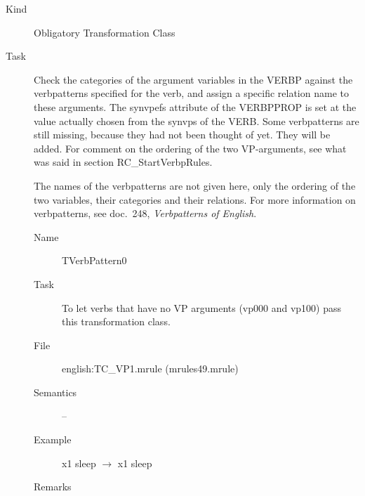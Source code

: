\begin{description}
\item[Kind] Obligatory Transformation Class
\item[Task] Check the categories of the argument variables in the VERBP 
against the verbpatterns specified for the 
verb, and assign a specific relation name to these arguments.
The synvpefs attribute of the VERBPPROP is set at the value actually 
chosen from the synvps of the VERB. Some verbpatterns are still missing, 
because they had not been thought of yet. They will be added. 
For comment on the ordering of the two VP-arguments, see what was said in 
section RC\_StartVerbpRules.

The names of the verbpatterns are not given here, only the ordering of the two 
variables, their categories and their relations. For more information on 
verbpatterns, see doc.\ 248, {\em Verbpatterns of English\/}.

\vspace{1 cm}
\begin{description}
\item[Name] TVerbPattern0
\item[Task] To let verbs that have no VP arguments (vp000 and vp100) pass this 
transformation class.
\item[File] english:TC\_VP1.mrule (mrules49.mrule)
\item[Semantics] --
\item[Example] x1 sleep $\rightarrow$ x1 sleep
\item[Remarks]
\end{description}


\end{description}
